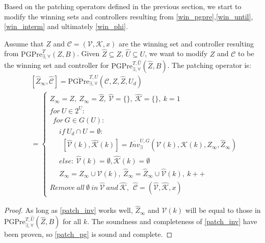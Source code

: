 Based on the patching operators defined in the previous section, we start to modify the winning sets and controllers resulting from \eqref{win_pgpre},\eqref{win_until},\eqref{win_interm} and ultimately \eqref{win_phi}.

Assume that $ Z $ and $ \mathcal{C} = (\mathcal{V},\mathcal{K},x) $ are the winning set and controller resulting from  $ \text{PGPre}_{\exists,\forall}^{T} (Z,B)$. Given $ \widehat{Z}\subseteq Z $,  $ \widehat{U}\subseteq U $, we want to modify $ Z $ and $ \mathcal{C} $ to be the winning set and controller for $ \text{PGPre}_{\exists, \forall}^{T,\widehat{U}}(\widehat{Z},B)$. The patching operator is:
\begin{align}
&[\widehat{Z}_{\infty},\widehat{\mathcal{C}}]=\overline{\text{PGPre}}_{\exists,\forall}^{T,U} (\mathcal{C},Z,\widehat{Z},U_d)\\
&= \begin{cases}
Z_{\infty} = Z,\ \widehat{Z}_{\infty}=\widehat{Z},\ \widehat{\mathcal{V}}=\{\},\ \widehat{\mathcal{K}}=\{\},\ k = 1\\
for\ U\in 2^U:\\
\ \ for\ G\in G(U):\\
\ \ \ \ \ \ if\ U_d\cap U = \emptyset:\\
\ \ \ \ \ \ \ \  [\widehat{\mathcal{V}}(k),\widehat{\mathcal{K}}(k)]=\overline{Inv}_{\exists}^{U,G}(\mathcal{V}(k),\mathcal{K}(k),Z_\infty, \widehat{Z}_\infty)\\
\ \ \ \ \ \ else:\ \widehat{\mathcal{V}}(k)=\emptyset, \widehat{\mathcal{K}}(k) = \emptyset\\
\ \ \ \ \ \  Z_\infty = Z_\infty\cup \mathcal{V}(k),\ \widehat{Z}_{\infty} = \widehat{Z}_{\infty} \cup \widehat{\mathcal{V}}(k),\ k++\\
Remove\ all\ \emptyset\ in\ \widehat{\mathcal{V}}\ and \ \widehat{\mathcal{K}},\ \ 
\widehat{\mathcal{C}} = (\widehat{\mathcal{V}},\widehat{\mathcal{K}},x)
\end{cases}\label{patch_pg}
\end{align}

\begin{proof}
	As long as \eqref{patch_inv} works well, $ \widehat{Z}_\infty $ and $ \mathcal{V}(k) $ will be equal to those in $ \text{PGPre}^{T,\widehat{U}}_{\exists,\forall}(\widehat{Z},B) $ for all $ k $. The soundness and completeness of \eqref{patch_inv} have been proven, so \eqref{patch_pg} is sound and complete.
\end{proof}

